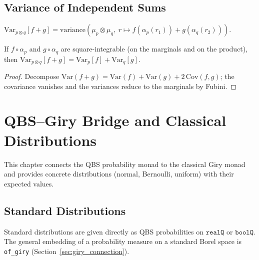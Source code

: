 \section{Variance of Independent Sums}\label{sec:var_indep_sum}

\begin{definition}\label{def:qbs_prod_variance}
  \rocqok
  $\mathrm{Var}_{p \otimes q}[f + g] =
  \mathrm{variance}(\mu_p \otimes \mu_q,\;
  r \mapsto f(\alpha_p(r_1)) + g(\alpha_q(r_2)))$.
\end{definition}

\begin{theorem}\label{thm:qbs_prod_varianceD}
  \rocqok
  If $f \circ \alpha_p$ and $g \circ \alpha_q$ are square-integrable
  (on the marginals and on the product), then
  $\mathrm{Var}_{p \otimes q}[f + g] = \mathrm{Var}_p[f] + \mathrm{Var}_q[g]$.
\end{theorem}
\begin{proof}
  \rocqok
  Decompose $\mathrm{Var}(f+g) = \mathrm{Var}(f) + \mathrm{Var}(g) + 2\,\mathrm{Cov}(f,g)$;
  the covariance vanishes and the variances reduce to the marginals by
  Fubini.
\end{proof}

\chapter{QBS--Giry Bridge and Classical Distributions}\label{ch:giry}

This chapter connects the QBS probability monad to the classical Giry
monad and provides concrete distributions (normal, Bernoulli, uniform)
with their expected values.

\section{Standard Distributions}\label{sec:distributions}

Standard distributions are given directly as QBS probabilities on
$\mathtt{realQ}$ or $\mathtt{boolQ}$. The general embedding of a
probability measure on a standard Borel space is \texttt{of\_giry}
(Section~\ref{sec:giry_connection}).

